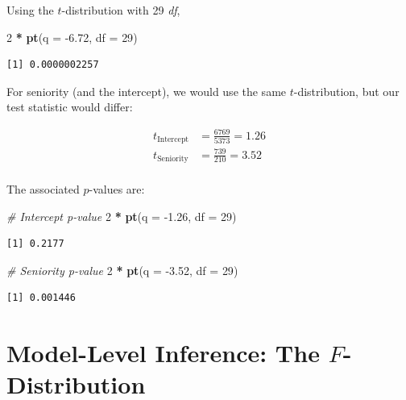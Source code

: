 \documentclass[]{book}
\newenvironment{Shaded}{\begin{snugshade}}{\end{snugshade}}
\newcommand{\CommentTok}[1]{\textcolor[rgb]{0.56,0.35,0.01}{\textit{#1}}}
\newcommand{\DataTypeTok}[1]{\textcolor[rgb]{0.13,0.29,0.53}{#1}}
\newcommand{\DecValTok}[1]{\textcolor[rgb]{0.00,0.00,0.81}{#1}}
\newcommand{\FloatTok}[1]{\textcolor[rgb]{0.00,0.00,0.81}{#1}}
\newcommand{\KeywordTok}[1]{\textcolor[rgb]{0.13,0.29,0.53}{\textbf{#1}}}
\newcommand{\NormalTok}[1]{#1}
\newcommand{\OperatorTok}[1]{\textcolor[rgb]{0.81,0.36,0.00}{\textbf{#1}}}
\newcommand{\StringTok}[1]{\textcolor[rgb]{0.31,0.60,0.02}{#1}}
\begin{document}
Using the \(t\)-distribution with 29 \emph{df},

\begin{Shaded}
\begin{Highlighting}[]
\DecValTok{2} \OperatorTok{*}\StringTok{ }\KeywordTok{pt}\NormalTok{(}\DataTypeTok{q =} \FloatTok{-6.72}\NormalTok{, }\DataTypeTok{df =} \DecValTok{29}\NormalTok{)}
\end{Highlighting}
\end{Shaded}

\begin{verbatim}
[1] 0.0000002257
\end{verbatim}

For seniority (and the intercept), we would use the same \(t\)-distribution, but our test statistic would differ:

\[
\begin{split}
t_{\mathrm{Intercept}} &= \frac{6769}{5373} = 1.26 \\
t_{\mathrm{Seniority}} &= \frac{739}{210} = 3.52 \\
\end{split}
\]

The associated \(p\)-values are:

\begin{Shaded}
\begin{Highlighting}[]
\CommentTok{# Intercept p-value}
\DecValTok{2} \OperatorTok{*}\StringTok{ }\KeywordTok{pt}\NormalTok{(}\DataTypeTok{q =} \FloatTok{-1.26}\NormalTok{, }\DataTypeTok{df =} \DecValTok{29}\NormalTok{)}
\end{Highlighting}
\end{Shaded}

\begin{verbatim}
[1] 0.2177
\end{verbatim}

\begin{Shaded}
\begin{Highlighting}[]
\CommentTok{# Seniority p-value}
\DecValTok{2} \OperatorTok{*}\StringTok{ }\KeywordTok{pt}\NormalTok{(}\DataTypeTok{q =} \FloatTok{-3.52}\NormalTok{, }\DataTypeTok{df =} \DecValTok{29}\NormalTok{)}
\end{Highlighting}
\end{Shaded}

\begin{verbatim}
[1] 0.001446
\end{verbatim}

\hypertarget{model-level-inference-the-f-distribution}{%
\section{\texorpdfstring{Model-Level Inference: The \(F\)-Distribution}{Model-Level Inference: The F-Distribution}}\label{model-level-inference-the-f-distribution}}
\end{document}

